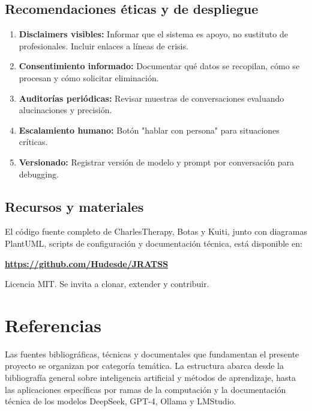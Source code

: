\documentclass[12pt,a4paper]{report}
\numberwithin{figure}{section}
\begin{document}
\vspace{1em}

\section{Recomendaciones éticas y de despliegue}
\label{sec:recomendaciones_eticas}

\begin{enumerate}
    \item \textbf{Disclaimers visibles:} Informar que el sistema es apoyo, no sustituto de profesionales. Incluir enlaces a líneas de crisis.
    \item \textbf{Consentimiento informado:} Documentar qué datos se recopilan, cómo se procesan y cómo solicitar eliminación.
    \item \textbf{Auditorías periódicas:} Revisar muestras de conversaciones evaluando alucinaciones y precisión.
    \item \textbf{Escalamiento humano:} Botón "hablar con persona" para situaciones críticas.
    \item \textbf{Versionado:} Registrar versión de modelo y prompt por conversación para debugging.
\end{enumerate}

\vspace{1em}

\section{Recursos y materiales}
\label{sec:recursos_materiales}

El código fuente completo de CharlesTherapy, Botas y Kuiti, junto con diagramas PlantUML, scripts de configuración y documentación técnica, está disponible en:

\begin{center}
\textbf{\url{https://github.com/Hudesde/JRATSS}}
\end{center}

\noindent Licencia MIT. Se invita a clonar, extender y contribuir.




\chapter*{Referencias}
Las fuentes bibliográficas, técnicas y documentales que fundamentan el presente proyecto se organizan por categoría temática. La estructura abarca desde la bibliografía general sobre inteligencia artificial y métodos de aprendizaje, hasta las aplicaciones específicas por ramas de la computación y la documentación técnica de los modelos DeepSeek, GPT-4, Ollama y LMStudio.
\end{document}
